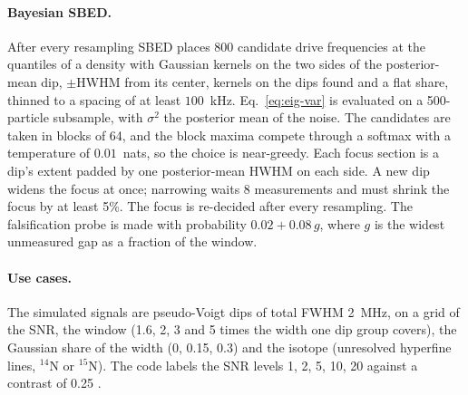 \paragraph{Bayesian SBED.} After every resampling SBED places 800 candidate drive frequencies at the quantiles of a
density with Gaussian kernels on the two sides of the posterior-mean dip, $\pm$HWHM from its center, kernels on the dips found and a
flat share, thinned to a spacing of at least $100$~kHz. Eq.~\eqref{eq:eig-var} is evaluated on a 500-particle
subsample, with $\sigma^2$ the posterior mean of the noise. The candidates are taken in blocks of 64, and the block
maxima compete through a softmax with a temperature of $0.01$~nats, so the choice is near-greedy. Each focus section
is a dip's extent padded by one posterior-mean HWHM on each side. A new dip widens the focus at once; narrowing waits
8 measurements and must shrink the focus by at least 5\%. The focus is re-decided after every resampling. The
falsification probe is made with probability $0.02+0.08\,g$, where $g$ is the widest unmeasured gap as a fraction of
the window.

\paragraph{Use cases.} The simulated signals are pseudo-Voigt dips of total FWHM 2~MHz, on a grid of the SNR, the
window (1.6, 2, 3 and 5 times the width one dip group covers), the Gaussian share of the width (0, 0.15, 0.3) and the
isotope (unresolved hyperfine lines, $^{14}$N or $^{15}$N). The code labels the SNR levels 1, 2, 5, 10, 20 against a
contrast of 0.25 . 
